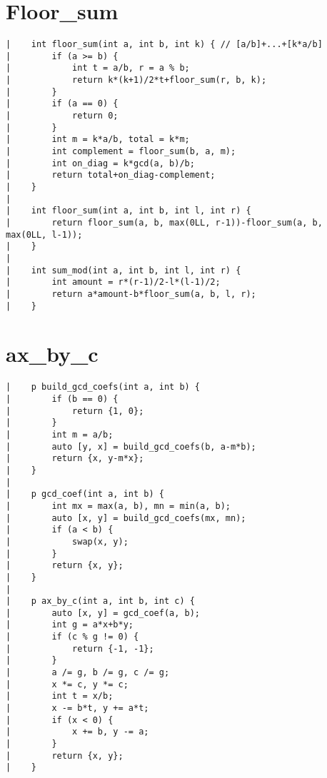 \documentclass[a4paper, 10pt]{article}
\begin{document}
\begin{center}
\section*{Floor\_sum}
\begin{verbatim}
|    int floor_sum(int a, int b, int k) { // [a/b]+...+[k*a/b]
|        if (a >= b) {
|            int t = a/b, r = a % b;
|            return k*(k+1)/2*t+floor_sum(r, b, k);
|        }
|        if (a == 0) {
|            return 0;
|        }
|        int m = k*a/b, total = k*m;
|        int complement = floor_sum(b, a, m);
|        int on_diag = k*gcd(a, b)/b;
|        return total+on_diag-complement;
|    }
|    
|    int floor_sum(int a, int b, int l, int r) {
|        return floor_sum(a, b, max(0LL, r-1))-floor_sum(a, b, max(0LL, l-1));
|    }
|    
|    int sum_mod(int a, int b, int l, int r) {
|        int amount = r*(r-1)/2-l*(l-1)/2;
|        return a*amount-b*floor_sum(a, b, l, r);
|    }
\end{verbatim}

\section*{ax\_by\_c}
\begin{verbatim}
|    p build_gcd_coefs(int a, int b) {
|        if (b == 0) {
|            return {1, 0};
|        }
|        int m = a/b;
|        auto [y, x] = build_gcd_coefs(b, a-m*b);
|        return {x, y-m*x};
|    }
|    
|    p gcd_coef(int a, int b) {
|        int mx = max(a, b), mn = min(a, b);
|        auto [x, y] = build_gcd_coefs(mx, mn);
|        if (a < b) {
|            swap(x, y);
|        }
|        return {x, y};
|    }
|    
|    p ax_by_c(int a, int b, int c) {
|        auto [x, y] = gcd_coef(a, b);
|        int g = a*x+b*y;
|        if (c % g != 0) {
|            return {-1, -1};
|        }
|        a /= g, b /= g, c /= g;
|        x *= c, y *= c;
|        int t = x/b;
|        x -= b*t, y += a*t;
|        if (x < 0) {
|            x += b, y -= a;
|        }
|        return {x, y};
|    }
\end{verbatim}


\end{center}
\end{document}
